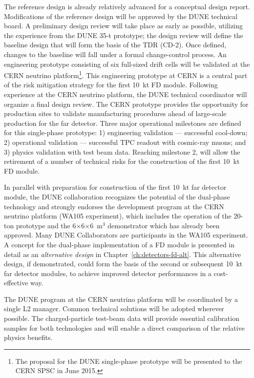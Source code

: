 The reference design is already relatively advanced for a
conceptual design report. Modifications of the reference design will
be approved by the DUNE technical board. A preliminary design
review will take place as early as possible, utilizing the experience
from the DUNE 35-t prototype; the design review will define the
baseline design that will form the basis of the TDR (CD-2).  Once
defined, changes to the baseline will fall under a formal
change-control process. An engineering prototype consisting of
six full-sized drift cells will be validated at the CERN neutrino
platform\footnote{The proposal for the DUNE single-phase prototype
  will be presented to the CERN SPSC in June 2015.}.  This engineering
prototype at CERN is a central part of the risk mitigation strategy
for the first 10~kt FD module. Following experience at the CERN
neutrino platform, the DUNE technical coordinator will organize a
final design review. The CERN prototype provides the opportunity for
production sites to validate manufacturing procedures ahead of
large-scale production for the far detector. Three major operational
milestones are defined for this single-phase prototype: 1) engineering
validation --- successful cool-down; 2) operational validation ---
successful TPC readout with cosmic-ray muons; and 3) physics
validation with test beam data. Reaching milestone 2, will allow the
retirement of a number of technical risks for the construction of the
first 10~kt FD module.

In parallel with preparation for construction of the first 10~kt far
detector module, the DUNE collaboration recognizes the potential of
the dual-phase technology and strongly endorses the development
program at the CERN neutrino platform (WA105 experiment), which
includes the operation of the 20-ton prototype and the
6$\times$6$\times$6~m$^3$ demonstrator which has already been
approved. Many DUNE Collaborators are participants in the WA105
experiment. A concept for the dual-phase implementation of a FD module
is presented in detail as an \textit{alternative design} in
Chapter~\ref{ch:detectors-fd-alt}. This alternative design, if
demonstrated, could form the basis of the second or subsequent 10~kt
far detector modules, to achieve improved detector performances in a
cost-effective way.

The DUNE program at the CERN neutrino platform will be coordinated by
a single L2 manager. Common technical solutions will be adopted
wherever possible.  The charged-particle test-beam data will provide
essential calibration samples for both technologies and will enable a
direct comparison of the relative physics benefits.


